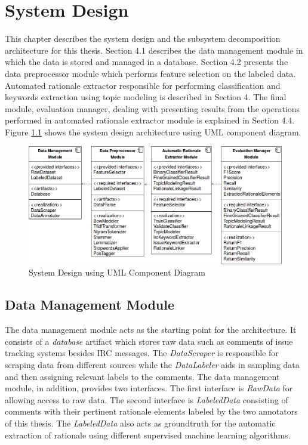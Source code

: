 \documentclass[a4paper,12pt,twoside]{report}
\begin{document}
\chapter{System Design}
This chapter describes the system design and the subsystem decomposition architecture for this thesis. Section 4.1 describes the data management module in which the data is stored and managed in a database. Section 4.2 presents the data preprocessor module which performs feature selection on the labeled data. Automated rationale extractor responsible for performing classification and keywords extraction using topic modeling is described in Section 4. The final module, evaluation manager, dealing with presenting results from the operations performed in automated rationale extractor module is explained in Section 4.4. Figure \ref{fig:systemDecomposition} shows the system design architecture using UML component diagram. 
\begin{figure}[h] %
    \centering
    \includegraphics[width=14cm]{system-decomposition}
    \caption{System Design using UML Component Diagram}
    \label{fig:systemDecomposition}
\end{figure}

\section{Data Management Module}
The data management module acts as the starting point for the architecture. It consists of a \textit{database} artifact which stores raw data such as comments of issue tracking systems besides \acs{IRC} messages. The \textit{DataScraper} is responsible for scraping data from different sources while the \textit{DataLabeler} aids in sampling data and then assigning relevant labels to the comments. The data management module, in addition, provides two interfaces. The first interface is \textit{RawData} for allowing access to raw data. The second interface is \textit{LabeledData} consisting of comments with their pertinent rationale elements labeled by the two annotators of this thesis. The \textit{LabeledData} also acts as groundtruth for the automatic extraction of rationale using different supervised machine learning algorithms. 
\end{document}
